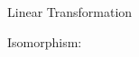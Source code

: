 \documentclass[10pt,a4paper]{article}
\begin{document}
\begin{center}
Linear Transformation \linebreak
\end{center}

\begin{flushleft}
Isomorphism:

\end{flushleft}
\end{document}
